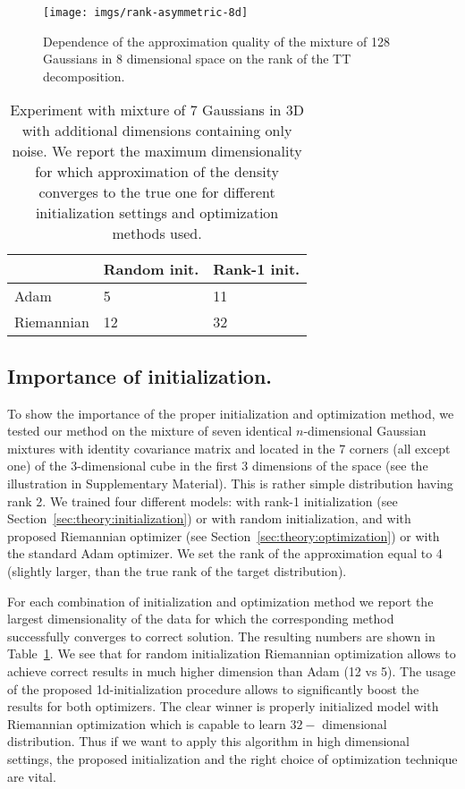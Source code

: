 \documentclass[accepted]{uai2021}
\begin{document}
  \begin{figure}[t]
    \centering
    \texttt{[image: imgs/rank-asymmetric-8d]}
    \caption{Dependence of the approximation quality of the mixture of 128 Gaussians in 8 dimensional space on the rank of the TT decomposition.} \label{fig:rank-asymmetric-8d}
  \end{figure}

  \begin{table}[t]
    \centering
    \begin{tabular}{|l|l|l|}
      \hline
      & Random init. & Rank-1 init. \\
      \hline
      Adam       & 5                   & 11                     \\
      \hline
      Riemannian & 12                  & 32                     \\
      \hline
    \end{tabular}
    \caption{Experiment with mixture of 7 Gaussians in 3D with additional dimensions containing only noise. We report the maximum dimensionality for which approximation of the density converges to the true one for different initialization settings and optimization methods used.}
    \label{tab:max-dimension}
  \end{table}


  \subsection{Importance of initialization.}
  \label{subsec:importance}
  To show the importance of the proper initialization and optimization method, we tested our method on the mixture of seven identical $n$-dimensional Gaussian mixtures with identity covariance matrix and located in the 7 corners (all except one) of the 3-dimensional cube in the first 3 dimensions of the space (see the illustration in Supplementary Material). This is rather simple distribution having rank 2. We trained four different models: with rank-1 initialization (see Section~\ref{sec:theory:initialization}) or with random initialization, and with proposed Riemannian optimizer (see Section~\ref{sec:theory:optimization}) or with the standard Adam optimizer. We set the rank of the approximation equal to 4 (slightly larger, than the true rank of the target distribution).

  For each combination of initialization and optimization method we report the largest dimensionality of the data for which the corresponding method successfully converges to correct solution. The resulting numbers are shown in Table~\ref{tab:max-dimension}. We see that for random initialization Riemannian optimization allows to achieve correct results in much higher dimension than Adam (12 vs 5). The usage of the proposed 1d-initialization procedure allows to significantly boost the results for both optimizers. The clear winner is properly initialized model with Riemannian optimization which is capable to learn $32-$ dimensional distribution. Thus if we want to apply this algorithm in high dimensional settings, the proposed initialization and the right choice of optimization technique are vital.
\end{document}
